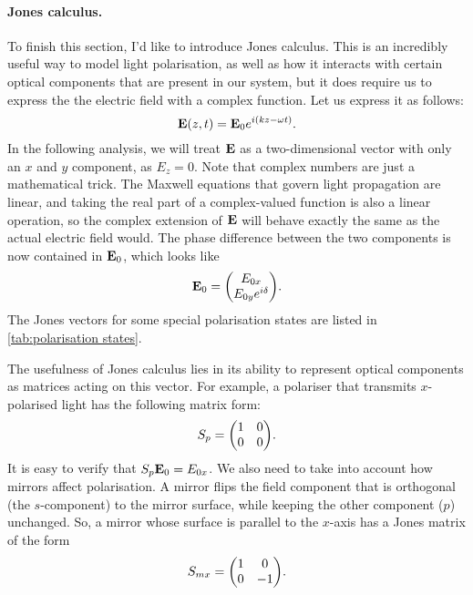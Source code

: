 \paragraph{Jones calculus.} To finish this section, I'd like to introduce Jones calculus. This is an incredibly useful way to model light polarisation, as well as how it interacts with certain optical components that are present in our system, but it does require us to express the the electric field with a complex function. Let us express it as follows:
\begin{equation}
	\vb{E}(z, t) = \vb{E}_0 e^{i(kz-\omega t)}.
	\label{eq:propagator}
\end{equation}
In the following analysis, we will treat $ \vb{E} $ as a two-dimensional vector with only an $ x $ and $ y $ component, as $ E_z = 0 $. Note that complex numbers are just a mathematical trick. The Maxwell equations that govern light propagation are linear, and taking the real part of a complex-valued function is also a linear operation, so the complex extension of $ \vb{E} $ will behave exactly the same as the actual electric field would. The phase difference between the two components is now contained in $ \vb{E}_0 $, which looks like
\begin{equation}
	\vb{E}_0 = \mqty(\Eox \\ \Eoy e^{i\delta} ).
\end{equation}
The Jones vectors for some special polarisation states are listed in \autoref{tab:polarisation states}.

The usefulness of Jones calculus lies in its ability to represent optical components as matrices acting on this vector. For example, a polariser that transmits $ x $-polarised light has the following matrix form:
\begin{equation}
	S_p = \mqty(1 & 0 \\ 0 & 0).
\end{equation}
It is easy to verify that $ S_p \vb{E}_0 = E_{0x} $.  We also need to take into account how mirrors affect polarisation. A mirror flips the field component that is orthogonal (the $ s $-component) to the mirror surface, while keeping the other component ($ p $) unchanged. So, a mirror whose surface is parallel to the $ x $-axis has a Jones matrix of the form
\begin{equation}
	S_{mx} = \mqty(1 & 0 \\ 0 & -1).
\end{equation}

